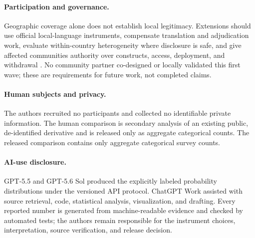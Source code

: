\paragraph{Participation and governance.}
Geographic coverage alone does not establish local legitimacy. Extensions should use
official local-language instruments, compensate translation and adjudication work,
evaluate within-country heterogeneity where disclosure is safe, and give affected
communities authority over constructs, access, deployment, and withdrawal
\citep{nekoto2020participatory,mohamed2020decolonial}. No community partner co-designed
or locally validated this first wave; these are requirements for future work, not
completed claims.

\paragraph{Human subjects and privacy.}
The authors recruited no participants and collected no identifiable private information.
The human comparison is secondary analysis of an existing public, de-identified
derivative and is released only as aggregate categorical counts. The released comparison contains only aggregate categorical survey counts.

\paragraph{AI-use disclosure.}
GPT-5.5 and GPT-5.6 Sol produced the explicitly labeled probability distributions under
the versioned API protocol. ChatGPT Work assisted with source retrieval, code, statistical
analysis, visualization, and drafting. Every reported number is generated from
machine-readable evidence and checked by automated tests; the authors remain
responsible for the instrument choices, interpretation, source verification, and
release decision.
\FloatBarrier
